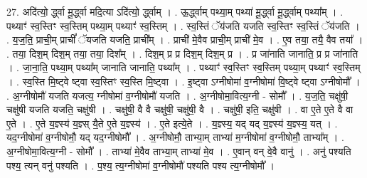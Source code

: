 \documentclass[17pt]{extarticle}
\begin{document}
27. अदि॑त्यो॒ र्द्ध्वा मू॒र्द्ध्वा मदि॒त्या ऽदि॑त्यो॒ र्द्ध्वाम् । . ऊ॒र्द्ध्वाम् पथ्या॒म् पथ्या॑ मू॒र्द्ध्वा मू॒र्द्ध्वाम् पथ्या᳚म् । . पथ्याꣳ॑ स्व॒स्तिꣳ स्व॒स्तिम् पथ्या॒म् पथ्याꣳ॑ स्व॒स्तिम् । . स्व॒स्तिं ॅय॑जति यजति स्व॒स्तिꣳ स्व॒स्तिं ॅय॑जति । . य॒ज॒ति॒ प्राची॒म् प्राचीं᳚ ॅयजति यजति॒ प्राची᳚म् । . प्राची॑ मे॒वैव प्राची॒म् प्राची॑ मे॒व । . ए॒व तया॒ तयै॒ वैव तया᳚ । . तया॒ दिश॒म् दिश॒म् तया॒ तया॒ दिश᳚म् । . दिश॒म् प्र प्र दिश॒म् दिश॒म् प्र । . प्र जा॑नाति जानाति॒ प्र प्र जा॑नाति । . जा॒ना॒ति॒ पथ्या॒म् पथ्या᳚म् जानाति जानाति॒ पथ्या᳚म् । . पथ्याꣳ॑ स्व॒स्तिꣳ स्व॒स्तिम् पथ्या॒म् पथ्याꣳ॑ स्व॒स्तिम् । . स्व॒स्ति मि॒ष्ट्वे ष्ट्वा स्व॒स्तिꣳ स्व॒स्ति मि॒ष्ट्वा । . इ॒ष्ट्वा ऽग्नीषोमा॑ व॒ग्नीषोमा॑ वि॒ष्ट्वे ष्ट्वा ऽग्नीषोमौ᳚ । . अ॒ग्नीषोमौ॑ यजति यजत्य॒ ग्नीषोमा॑ व॒ग्नीषोमौ॑ यजति । . अ॒ग्नीषोमा॒वित्य॒ग्नी - सोमौ᳚ । . य॒ज॒ति॒ चक्षु॑षी॒ चक्षु॑षी यजति यजति॒ चक्षु॑षी । . चक्षु॑षी॒ वै वै चक्षु॑षी॒ चक्षु॑षी॒ वै । . चक्षु॑षी॒ इति॒ चक्षु॑षी । . वा ए॒ते ए॒ते वै वा ए॒ते । . ए॒ते य॒ज्ञ्स्य॑ य॒ज्ञ्स् यै॒ते ए॒ते य॒ज्ञ्स्य॑ । . ए॒ते इत्ये॒ते । . य॒ज्ञ्स्य॒ यद् यद् य॒ज्ञ्स्य॑ य॒ज्ञ्स्य॒ यत् । . यद॒ग्नीषोमा॑ व॒ग्नीषोमौ॒ यद् यद॒ग्नीषोमौ᳚ । . अ॒ग्नीषोमौ॒ ताभ्या॒म् ताभ्या॑ म॒ग्नीषोमा॑ व॒ग्नीषोमौ॒ ताभ्या᳚म् । . अ॒ग्नीषोमा॒वित्य॒ग्नी - सोमौ᳚ । . ताभ्या॑ मे॒वैव ताभ्या॒म् ताभ्या॑ मे॒व । . ए॒वान् वन् वे॒वै वानु॑ । . अनु॑ पश्यति पश्य॒ त्यन् वनु॑ पश्यति । . प॒श्य॒ त्य॒ग्नीषोमा॑ व॒ग्नीषोमौ॑ पश्यति पश्य त्य॒ग्नीषोमौ᳚ । \newline
\end{document}
